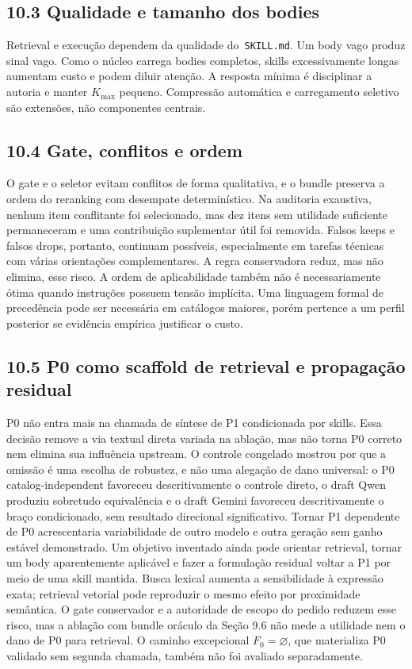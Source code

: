 \documentclass[12pt,a4paper]{article}
\begin{document}
\subsection*{10.3 Qualidade e tamanho dos bodies}

Retrieval e execução dependem da qualidade do\texttt{ SKILL.md}. Um body vago produz sinal vago. Como o núcleo carrega bodies completos, skills excessivamente longas aumentam custo e podem diluir atenção. A resposta mínima é disciplinar a autoria e manter \(K_{\max}\) pequeno. Compressão automática e carregamento seletivo são extensões, não componentes centrais.


\subsection*{10.4 Gate, conflitos e ordem}

O gate e o seletor evitam conflitos de forma qualitativa, e o bundle preserva a ordem do reranking com desempate determinístico. Na auditoria exaustiva, nenhum item conflitante foi selecionado, mas dez itens sem utilidade suficiente permaneceram e uma contribuição suplementar útil foi removida. Falsos keeps e falsos drops, portanto, continuam possíveis, especialmente em tarefas técnicas com várias orientações complementares. A regra conservadora reduz, mas não elimina, esse risco. A ordem de aplicabilidade também não é necessariamente ótima quando instruções possuem tensão implícita. Uma linguagem formal de precedência pode ser necessária em catálogos maiores, porém pertence a um perfil posterior se evidência empírica justificar o custo.


\subsection*{10.5 P0 como scaffold de retrieval e propagação residual}

P0 não entra mais na chamada de síntese de P1 condicionada por skills. Essa decisão remove a via textual direta variada na ablação, mas não torna P0 correto nem elimina sua influência upstream. O controle congelado mostrou por que a omissão é uma escolha de robustez, e não uma alegação de dano universal: o P0 catalog-independent favoreceu descritivamente o controle direto, o draft Qwen produziu sobretudo equivalência e o draft Gemini favoreceu descritivamente o braço condicionado, sem resultado direcional significativo. Tornar P1 dependente de P0 acrescentaria variabilidade de outro modelo e outra geração sem ganho estável demonstrado. Um objetivo inventado ainda pode orientar retrieval, tornar um body aparentemente aplicável e fazer a formulação residual voltar a P1 por meio de uma skill mantida. Busca lexical aumenta a sensibilidade à expressão exata; retrieval vetorial pode reproduzir o mesmo efeito por proximidade semântica. O gate conservador e a autoridade de escopo do pedido reduzem esse risco, mas a ablação com bundle oráculo da Seção 9.6 não mede a utilidade nem o dano de P0 para retrieval. O caminho excepcional \(F_0 = \varnothing\), que materializa P0 validado sem segunda chamada, também não foi avaliado separadamente.
\end{document}
